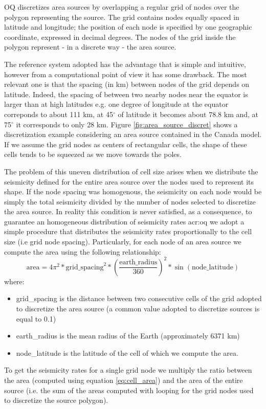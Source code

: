 %
OQ discretizes area sources by overlapping a regular grid of nodes
over the polygon representing the source. The grid contains nodes 
equally spaced in latitude and longitude; the position of each node
is specified by one geographic coordinate, expressed in decimal degrees. 
The nodes of the grid inside the polygon represent - in a discrete way - 
the area source.

The reference system adopted has the advantage that is simple and 
intuitive, however from a computational point of view it has some 
drawback. The most relevant one is that the spacing (in km) between 
nodes of the grid depends on latitude. 
%
Indeed, the spacing of between two nearby nodes near the equator is 
larger than at high latitudes e.g. one degree of longitude at the equator 
correponds to about 111 km, at 45$^\circ$ of latitude it becomes 
about 78.8 km and, at 75$^\circ$ it corresponds to only 28 km. 
%
Figure \ref{fig:area_source_discret} shows a discretization example 
considering an area source contained in the Canada model. If we assume 
the grid nodes as centers of rectangular cells, the shape of these cells
tends to be squeezed as we move towards the poles.

The problem of this uneven distribution of cell size arises when we 
distribute the seismicity defined for the entire area source over the 
nodes used to represent its shape. If the node spacing was homogenous,
the seismicity on each node would be simply the total seismicity divided 
by the number of nodes selected to discretize the area source.
%
In reality this condition is never satisfied, as a consequence, to 
guarantee an homogeneous distribution of seismicity rates \gls{acr:oq} 
we adopt a simple procedure that distributes the seismicity rates 
proportionally to the cell size (i.e grid node spacing).
%
Particularly, for each node of an area source we compute the area using
the following relationship:
\begin{equation}
 \text{area} = 4\pi^2 * \text{grid\_spacing}^2 *  
 	\left(\frac{\text{earth\_radius}}{360}\right)^2 * 
 	\sin(\text{node\_latitude})
 	\label{eq:cell_area}
\end{equation}
where:
\begin{itemize}
\item grid\_spacing is the distance between two consecutive cells 
	of the grid adopted to discretize the area source (a common value 
	adopted to discretize sources is equal to 0.1)
\item earth\_radius is the mean radius of the Earth (approximately 
	6371 km) 
\item node\_latitude is the latitude of the cell of which we compute
	the area.
\end{itemize}
%
To get the seismicity rates for a single grid node we multiply the 
ratio between the area (computed using equation \ref{eq:cell_area}) and 
the area of the entire source (i.e. the sum of the areas computed 
with looping for the grid nodes used to discretize the source polygon).
%
